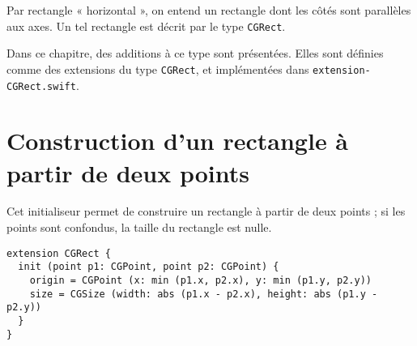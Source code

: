 


Par rectangle « horizontal », on entend un rectangle dont les côtés sont parallèles aux axes. Un tel rectangle est décrit par le type \texttt{CGRect}.

Dans ce chapitre, des additions à ce type sont présentées. Elles sont définies comme des extensions du type \texttt{CGRect}, et implémentées dans \texttt{extension-CGRect.swift}.




\section{Construction d'un rectangle à partir de deux points}

Cet initialiseur permet de construire un rectangle à partir de deux points ; si les points sont confondus, la taille du rectangle est nulle.


\begin{lstlisting}
extension CGRect {
  init (point p1: CGPoint, point p2: CGPoint) {
    origin = CGPoint (x: min (p1.x, p2.x), y: min (p1.y, p2.y))
    size = CGSize (width: abs (p1.x - p2.x), height: abs (p1.y - p2.y))
  }
}
\end{lstlisting}

